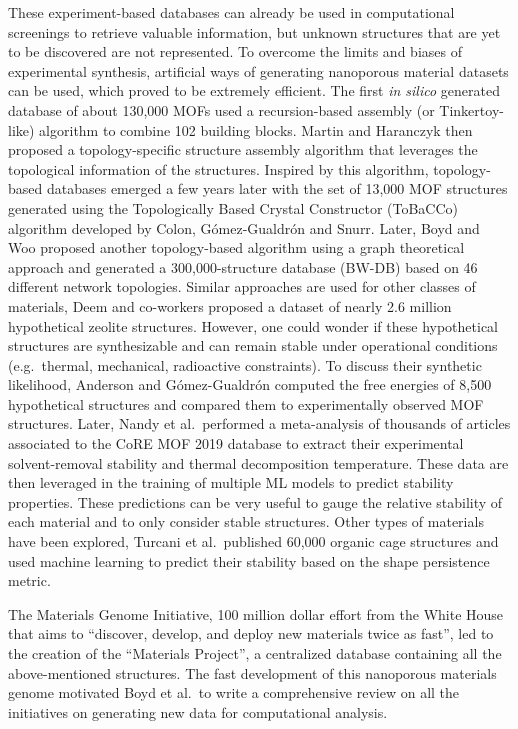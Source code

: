 \documentclass[main.tex]{subfiles}
\begin{document}
These experiment-based databases can already be used in computational screenings to retrieve valuable information, but unknown structures that are yet to be discovered are not represented. To overcome the limits and biases of experimental synthesis, artificial ways of generating nanoporous material datasets can be used, which proved to be extremely efficient. The first \emph{in silico} generated database of about 130,000 MOFs used a recursion-based assembly (or Tinkertoy-like) algorithm to combine 102 building blocks.\autocite{Wilmer_2012} Martin and Haranczyk then proposed a topology-specific structure assembly algorithm that leverages the topological information of the structures.\autocite{Martin_2014} Inspired by this algorithm, topology-based databases emerged a few years later with the set of 13,000 MOF structures generated using the Topologically Based Crystal Constructor (ToBaCCo) algorithm developed by Colon, G{\'{o}}mez-Gualdr{\'{o}}n and Snurr.\autocite{Colon_2017} Later, Boyd and Woo proposed another topology-based algorithm using a graph theoretical approach and generated a 300,000-structure database (BW-DB) based on 46 different network topologies.\autocite{Boyd_2016} Similar approaches are used for other classes of materials, Deem and co-workers proposed a dataset of nearly 2.6 million hypothetical zeolite structures.\autocite{Earl_2006,Deem_2009,Pophale_2011} However, one could wonder if these hypothetical structures are synthesizable and can remain stable under operational conditions (e.g.\ thermal, mechanical, radioactive constraints). To discuss their synthetic likelihood, Anderson and G{\'{o}}mez-Gualdr{\'{o}}n computed the free energies of 8,500 hypothetical structures and compared them to experimentally observed MOF structures.\autocite{Anderson_2020} Later, Nandy et al.\ performed a meta-analysis of thousands of articles associated to the CoRE MOF 2019 database to extract their experimental solvent-removal stability and thermal decomposition temperature.\autocite{Nandy_2021} These data are then leveraged in the training of multiple ML models to predict stability properties. These predictions can be very useful to gauge the relative stability of each material and to only consider stable structures. Other types of materials have been explored, Turcani et al.\ published 60,000 organic cage structures and used machine learning to predict their stability based on the shape persistence metric.\autocite{Turcani_2018}

The Materials Genome Initiative, 100 million dollar effort from the White House that aims to ``discover, develop, and deploy new materials twice as fast'', led to the creation of the ``Materials Project'', a centralized database containing all the above-mentioned structures.\autocite{kalil2011national,Matgenome,Jain_2013}
The fast development of this nanoporous materials genome motivated Boyd et al.\ to write a comprehensive review on all the initiatives on generating new data for computational analysis.\autocite{Boyd_2017}
\end{document}
